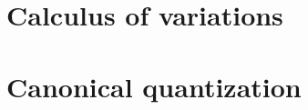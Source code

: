 \documentclass[a4paper]{article}
\theoremstyle{definition}
\numberwithin{equation}{section}
\begin{document}
  \begin{appendices}
    \section{Calculus of variations}\label{appendix: calculus of variation}
    

    \section{Canonical quantization}\label{appendix:canonical_quantization}
    
  \end{appendices}

  \newpage

  \printbibliography{}
\end{document}

